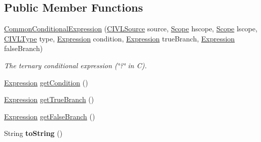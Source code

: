 \subsection*{Public Member Functions}
\begin{DoxyCompactItemize}
\item 
\hyperlink{classedu_1_1udel_1_1cis_1_1vsl_1_1civl_1_1model_1_1common_1_1expression_1_1CommonConditionalExpression_a0ef382fc69339d4e5db87be23dca6592}{Common\+Conditional\+Expression} (\hyperlink{interfaceedu_1_1udel_1_1cis_1_1vsl_1_1civl_1_1model_1_1IF_1_1CIVLSource}{C\+I\+V\+L\+Source} source, \hyperlink{interfaceedu_1_1udel_1_1cis_1_1vsl_1_1civl_1_1model_1_1IF_1_1Scope}{Scope} hscope, \hyperlink{interfaceedu_1_1udel_1_1cis_1_1vsl_1_1civl_1_1model_1_1IF_1_1Scope}{Scope} lscope, \hyperlink{interfaceedu_1_1udel_1_1cis_1_1vsl_1_1civl_1_1model_1_1IF_1_1type_1_1CIVLType}{C\+I\+V\+L\+Type} type, \hyperlink{interfaceedu_1_1udel_1_1cis_1_1vsl_1_1civl_1_1model_1_1IF_1_1expression_1_1Expression}{Expression} condition, \hyperlink{interfaceedu_1_1udel_1_1cis_1_1vsl_1_1civl_1_1model_1_1IF_1_1expression_1_1Expression}{Expression} true\+Branch, \hyperlink{interfaceedu_1_1udel_1_1cis_1_1vsl_1_1civl_1_1model_1_1IF_1_1expression_1_1Expression}{Expression} false\+Branch)
\begin{DoxyCompactList}\small\item\em The ternary conditional expression (\char`\"{}?\char`\"{} in C). \end{DoxyCompactList}\item 
\hyperlink{interfaceedu_1_1udel_1_1cis_1_1vsl_1_1civl_1_1model_1_1IF_1_1expression_1_1Expression}{Expression} \hyperlink{classedu_1_1udel_1_1cis_1_1vsl_1_1civl_1_1model_1_1common_1_1expression_1_1CommonConditionalExpression_ae10c611fbdc59ded436a2d6051275bc9}{get\+Condition} ()
\item 
\hyperlink{interfaceedu_1_1udel_1_1cis_1_1vsl_1_1civl_1_1model_1_1IF_1_1expression_1_1Expression}{Expression} \hyperlink{classedu_1_1udel_1_1cis_1_1vsl_1_1civl_1_1model_1_1common_1_1expression_1_1CommonConditionalExpression_aa99244e30d92326766630fce52113211}{get\+True\+Branch} ()
\item 
\hyperlink{interfaceedu_1_1udel_1_1cis_1_1vsl_1_1civl_1_1model_1_1IF_1_1expression_1_1Expression}{Expression} \hyperlink{classedu_1_1udel_1_1cis_1_1vsl_1_1civl_1_1model_1_1common_1_1expression_1_1CommonConditionalExpression_a0a3c266a77c4e67be9d5b37057061741}{get\+False\+Branch} ()
\item 
\hypertarget{classedu_1_1udel_1_1cis_1_1vsl_1_1civl_1_1model_1_1common_1_1expression_1_1CommonConditionalExpression_a46a2fca19131d116564e57cf546131c3}{}String {\bfseries to\+String} ()\label{classedu_1_1udel_1_1cis_1_1vsl_1_1civl_1_1model_1_1common_1_1expression_1_1CommonConditionalExpression_a46a2fca19131d116564e57cf546131c3}


\end{DoxyCompactItemize}
